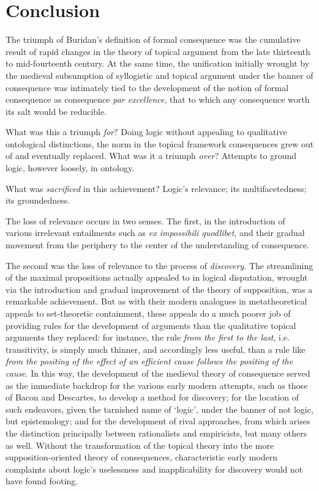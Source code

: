 \documentclass[]{article}
\begin{document}
		\section{Conclusion}
		The triumph of Buridan's definition of formal consequence was the cumulative result of rapid changes in the theory of topical argument from the late thirteenth to mid-fourteenth century. At the same time, the unification initially wrought by the medieval subsumption of syllogistic and topical argument under the banner of consequence was intimately tied to the development of the notion of formal consequence as consequence \textit{par excellence}, that to which any consequence worth its salt would be reducible. 
		
		
		What was this a triumph \textit{for}? Doing logic without appealing to qualitative ontological distinctions, the norm in the topical framework consequences grew out of and eventually replaced. What was it a triumph \textit{over}? Attempts to ground logic, however loosely, in ontology. 
		
		What was \textit{sacrificed} in this achievement? Logic's relevance; its multifacetedness; its groundedness.
		
		The loss of relevance occurs in two senses. The first, in the introduction of various irrelevant entailments such as \textit{ex impossibili quodlibet}, and their gradual movement from the periphery to the center of the understanding of consequence. 
		
		The second was the loss of relevance to the process of \textit{discovery}. The streamlining of the maximal propositions actually appealed to in logical disputation, wrought via the introduction and gradual improvement of the theory of supposition, was a remarkable achievement. But as with their modern analogues in metatheoretical appeals to set-theoretic containment, these appeals do a much poorer job of providing rules for the development of arguments than the qualitative topical arguments they replaced: for instance, the rule \textit{from the first to the last}, i.e. transitivity, is simply much thinner, and accordingly less useful, than a rule like \textit{from the positing of the effect of an efficient cause follows the positing of the cause}. In this way, the development of the medieval theory of consequence served as the immediate backdrop for the various early modern attempts, such as those of Bacon and Descartes, to develop a method for discovery; for the location of such endeavors, given the tarnished name of `logic', under the banner of not logic, but epistemology; and for the development of rival approaches, from which arises the distinction principally between rationalists and empiricists, but many others as well. Without the transformation of the topical theory into the more supposition-oriented theory of consequences, characteristic early modern complaints about logic's uselessness and inapplicability for discovery would not have found footing. 
		
\end{document}
